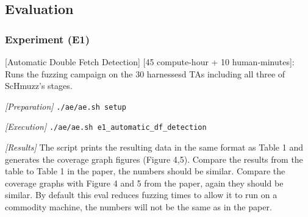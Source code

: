 \documentclass[conference]{IEEEtran}
\begin{document}
\subsection{Evaluation}





\subsubsection{Experiment (E1)}
[Automatic Double Fetch Detection] [45 compute-hour + 10 human-minutes]: Runs the fuzzing campaign on the 30 harnessesd TAs including all three of ScHmuzz's stages.


\textit{[Preparation]}
\small{\texttt{./ae/ae.sh setup}}
\normalsize

\textit{[Execution]}
\footnotesize
\texttt{./ae/ae.sh e1\_automatic\_df\_detection}
\normalsize

\textit{[Results]}
The script prints the resulting data in the same format as Table 1 and generates the coverage graph figures (Figure 4,5).
Compare the results from the table to Table 1 in the paper, the numbers should be similar. Compare the coverage graphs with 
Figure 4 and 5 from the paper, again they should be similar. By default this eval reduces fuzzing times to allow it to run on a commodity machine, the numbers will not be the same as in the paper.
\end{document}

